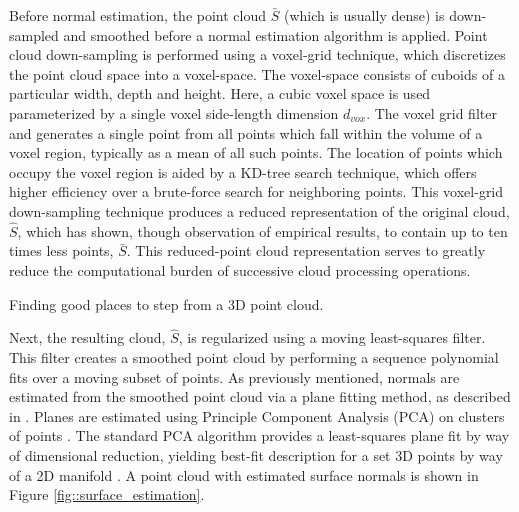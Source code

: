 			Before normal estimation, the point cloud $\bar{S}$ (which is usually dense) is down-sampled and smoothed before a normal estimation algorithm is applied. Point cloud down-sampling is performed using a voxel-grid technique, which discretizes the point cloud space into a voxel-space. The voxel-space consists of cuboids of a particular width, depth and height. Here, a cubic voxel space is used parameterized by a single voxel side-length dimension $d_{vox}$. The voxel grid filter and generates a single point from all points which fall within the volume of a voxel region, typically as a mean of all such points. The location of points which occupy the voxel region is aided by a KD-tree search technique, which offers higher efficiency over a brute-force search for neighboring points. This voxel-grid down-sampling technique produces a reduced representation of the original cloud, $\hat{S}$, which has shown, though observation of empirical results, to contain up to ten times less points, $\bar{S}$. This reduced-point cloud representation serves to greatly reduce the computational burden of successive cloud processing operations.
			
			\begin{algorithm}[!h]
				\begin{algorithmic}
						\EndIf
					\EndFor
				\end{algorithmic}	
				\caption{Finding good places to step from a 3D point cloud.}
				\label{alg::goodspacestostep}
			\end{algorithm}

			Next, the resulting cloud, $\hat{S}$, is regularized using a moving least-squares filter. This filter creates a smoothed point cloud by performing a sequence polynomial fits over a moving subset of points. As previously mentioned, normals are estimated from the smoothed point cloud via a plane fitting method, as described in \cite{Mitra2003}. Planes are estimated using Principle Component Analysis (PCA) on clusters of points \cite{Castillo2013}. The standard PCA algorithm provides a least-squares plane fit by way of dimensional reduction, yielding best-fit description for a set 3D points by way of a 2D manifold \cite{Pearson1901}. A point cloud with estimated surface normals is shown in Figure \ref{fig::surface_estimation}.

